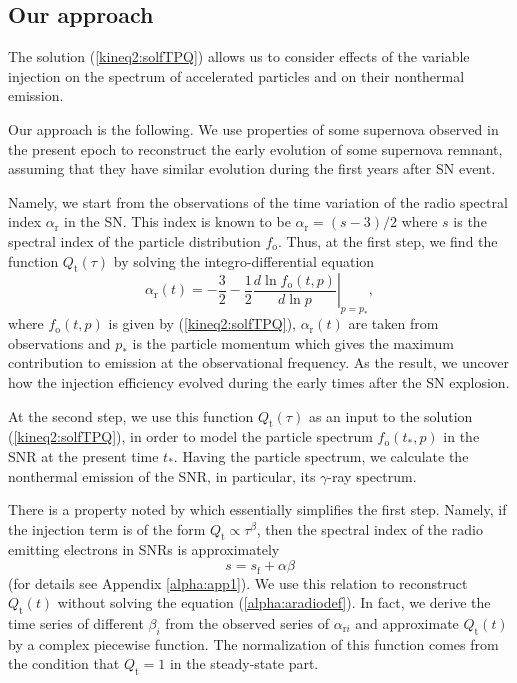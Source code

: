 \documentclass{aa}
\newcommand\rs[1]{_\mathrm{#1}}
\newcommand\g{$\gamma$}
\begin{document}
\subsection{Our approach}

The solution (\ref{kineq2:solfTPQ}) allows us to consider effects of the variable injection on the spectrum of accelerated particles and on their nonthermal emission. 

Our approach is the following. We use properties of some supernova observed in the present epoch to reconstruct the early evolution of some supernova remnant, assuming that they have similar evolution during the first years after SN event. 

Namely, we start from the observations of the time variation of the radio spectral index $\alpha\rs{r}$ in the SN. 
This index is known to be $\alpha\rs{r}=(s-3)/2$ where $s$ is the spectral index of the particle distribution $f\rs{o}$. 
Thus, at the first step, we find the function $Q\rs{t}(\tau)$ by solving the integro-differential equation 
\begin{equation}
 \alpha\rs{r}(t)=-\frac{3}{2}-\left.\frac{1}{2}\frac{d\ln f\rs{o}(t,p)}{d\ln p}\right|_{p=p\rs{*}},
 \label{alpha:aradiodef}
\end{equation}
where $f\rs{o}(t,p)$ is given by (\ref{kineq2:solfTPQ}), $\alpha\rs{r}(t)$ are taken from observations and $p\rs{*}$ is the particle momentum which gives the maximum contribution to emission at the observational frequency. 
As the result, we uncover how the injection efficiency evolved during the early times after the SN explosion. 

At the second step, we use this function $Q\rs{t}(\tau)$ as an input to the solution (\ref{kineq2:solfTPQ}), in order to model the particle spectrum $f\rs{o}(t\rs{*},p)$ in the SNR at the present time $t\rs{*}$. Having the particle spectrum, we calculate the nonthermal emission of the SNR, in particular, its \g-ray spectrum. 

There is a property noted by \citet{Petruk-Kopytko-2016} which essentially simplifies the first step. 
Namely, if the injection term is of the form $Q\rs{t}\propto \tau^\beta$, then 
the spectral index of the radio emitting electrons in SNRs is approximately 
\begin{equation}
 s=s\rs{f}+\alpha\beta
 \label{alpha:sradiosnr}
\end{equation}
(for details see Appendix \ref{alpha:app1}).
We use this relation to reconstruct $Q\rs{t}(t)$ without solving the equation (\ref{alpha:aradiodef}). 
In fact, we derive the time series of different $\beta_i$ from the observed series of $\alpha_{\mathrm{r}i}$ and approximate $Q\rs{t}(t)$ by a complex piecewise function. 
The normalization of this function comes from the condition that $Q\rs{t}=1$ in the steady-state part.  
\end{document}
